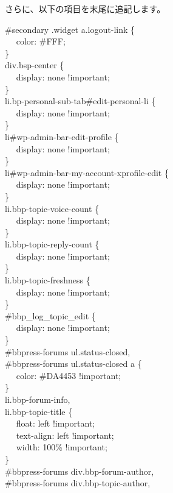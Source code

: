 \documentclass[titlepage,10pt,a4paper,uplatex]{jsbook}
\newenvironment{content}{\begin{shaded}\vspace{-1em}\raggedright\ttfamily\footnotesize\setlength{\baselineskip}{1.4em}}{\end{shaded}\vspace{-1em}}
\begin{document}
さらに、以下の項目を末尾に追記します。

\begin{content}
\#secondary .widget a.logout-link \{\\
 ~ ~color: \#FFF;\\
\}\\
div.bsp-center \{\\
 ~ ~display: none !important;\\
\}\\
li.bp-personal-sub-tab\#edit-personal-li \{\\
 ~ ~display: none !important;\\
\}\\
li\#wp-admin-bar-edit-profile \{\\
 ~ ~display: none !important;\\
\}\\
li\#wp-admin-bar-my-account-xprofile-edit \{\\
 ~ ~display: none !important;\\
\}\\
li.bbp-topic-voice-count \{\\
 ~ ~display: none !important;\\
\}\\
li.bbp-topic-reply-count \{\\
 ~ ~display: none !important;\\
\}\\
li.bbp-topic-freshness \{\\
 ~ ~display: none !important;\\
\}\\
\#bbp\_log\_topic\_edit \{\\
 ~ ~display: none !important;\\
\}\\
\#bbpress-forums ul.status-closed,\\
\#bbpress-forums ul.status-closed a \{\\
 ~ ~color: \#DA4453 !important;\\
\}\\
li.bbp-forum-info,\\
li.bbp-topic-title \{\\
 ~ ~float: left !important;\\
 ~ ~text-align: left !important;\\
 ~ ~width: 100\% !important;\\
\}\\
\#bbpress-forums div.bbp-forum-author,\\
\#bbpress-forums div.bbp-topic-author,\\

\end{content}
\end{document}
